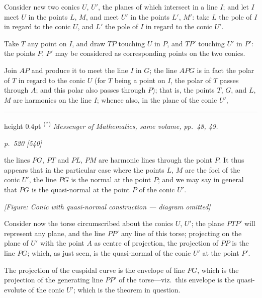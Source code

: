 \documentclass[11pt,a4paper]{article}
\theoremstyle{plain}
\theoremstyle{definition}
\begin{document}
Consider new two conics $U$, $U'$, the planes of which intersect in a line $I$; and let $I$ meet $U$ in the points $L$, $M$, and meet $U'$ in the points $L'$, $M'$: take $L$ the pole of $I$ in regard to the conic $U$, and $L'$ the pole of $I$ in regard to the conic $U'$.

Take $T$ any point on $I$, and draw $TP$ touching $U$ in $P$, and $TP'$ touching $U'$ in $P'$: the points $P$, $P'$ may be considered as corresponding points on the two conics.

Join $AP$ and produce it to meet the line $I$ in $G$; the line $APG$ is in fact the polar of $T$ in regard to the conic $U$ (for $T$ being a point on $I$, the polar of $T$ passes through $A$; and this polar also passes through $P$); that is, the points $T$, $G$, and $L$, $M$ are harmonics on the line $I$; whence also, in the plane of the conic $U'$,

\smallskip
\hrule height 0.4pt
\smallskip
\textsuperscript{(*)} \textit{Messenger of Mathematics, same volume, pp.~48, 49.}

\clearpage

\bigskip
\textit{p.~520 [540]}
\smallskip

the lines $PG$, $PT$ and $PL$, $PM$ are harmonic lines through the point $P$. It thus appears that in the particular case where the points $L$, $M$ are the foci of the conic $U'$, the line $PG$ is the normal at the point $P$; and we may say in general that $PG$ is the quasi-normal at the point $P$ of the conic $U'$.

\begin{center}
\textit{[Figure: Conic with quasi-normal construction --- diagram omitted]}
\end{center}

Consider now the torse circumscribed about the conics $U$, $U'$; the plane $PTP'$ will represent any plane, and the line $PP'$ any line of this torse; projecting on the plane of $U'$ with the point $A$ as centre of projection, the projection of $PP$ is the line $PG$; which, as just seen, is the quasi-normal of the conic $U'$ at the point $P'$.

The projection of the cuspidal curve is the envelope of line $PG$, which is the projection of the generating line $PP'$ of the torse---viz.\ this envelope is the quasi-evolute of the conic $U'$; which is the theorem in question.

\clearpage

\end{document}
